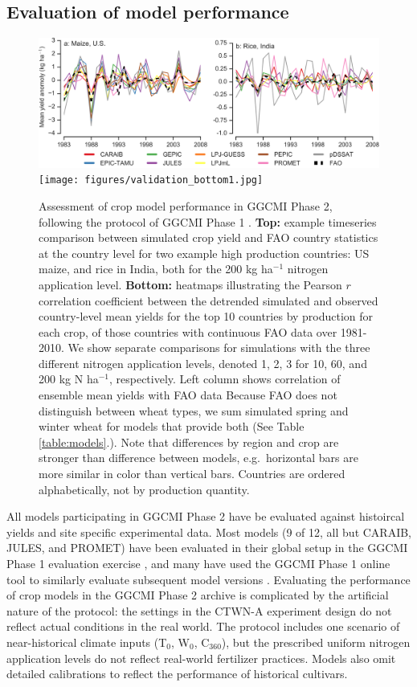 \documentclass[gmd, manuscript]{copernicus} %
\begin{document}
\subsection{Evaluation of model performance}
\begin{figure}[ht]
  \centering
  \includegraphics[width=14.5cm]{figures/validation_top.png}
  \texttt{[image: figures/validation\_bottom1.jpg]}
  \caption{
  Assessment of crop model performance in GGCMI Phase 2, following the protocol of GGCMI Phase 1 \citep{muller_global_2017}. 
  \textbf{Top:} example timeseries comparison between simulated crop yield and FAO country statistics \citep{FAOSTAT} at the country level for two example high production countries: US maize, and rice in India, both for the 200 kg ha$^{-1}$ nitrogen application level. 
  \textbf{Bottom:} heatmaps illustrating the Pearson $r$ correlation coefficient between the detrended simulated and observed country-level mean yields for the top 10 countries by production for each crop, of those countries with continuous FAO data over 1981-2010.
  We show separate comparisons for simulations with the three different nitrogen application levels, denoted 1, 2, 3 for 10, 60, and 200 kg N ha$^{-1}$, respectively. 
  Left column shows correlation of ensemble mean yields with FAO data 
  Because FAO does not distinguish between wheat types, we sum simulated spring and winter wheat for models that provide both (See Table \ref{table:models}.). 
  Note that differences by region and crop are stronger than difference between models, e.g.\ horizontal bars are more similar in color than vertical bars.
  Countries are ordered alphabetically, not by production quantity.
  }
  \label{fig:simulation_val}
\end{figure}

All models participating in GGCMI Phase 2 have be evaluated against histoircal yields and site specific experimental data.
Most models (9 of 12, all but  CARAIB, JULES, and PROMET) have been evaluated in their global setup in the GGCMI Phase 1 evaluation exercise \citep{muller_global_2017}, and many have used the GGCMI Phase 1 online tool to similarly evaluate subsequent model versions \citep[e.g.][]{von_Bloh_implementing_2018}.
Evaluating the performance of crop models in the GGCMI Phase 2 archive is complicated by the artificial nature of the protocol: the settings in the CTWN-A experiment design do not reflect actual conditions in the real world. 
The protocol includes one scenario of near-historical climate inputs (T$_0$, W$_0$, C$_{360}$), but the prescribed uniform nitrogen application levels do not reflect real-world fertilizer practices. Models also omit detailed calibrations to reflect the performance of historical cultivars. 
\end{document}
